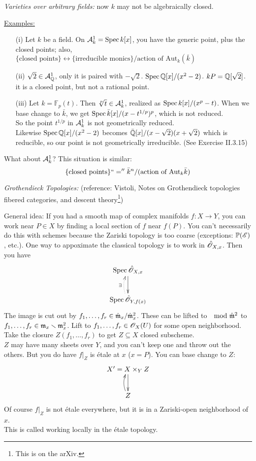  \emph{Varieties over arbitrary fields:} now $k$ may not be
 algebraically closed.

 \underline{Examples:}
 \begin{itemize}
 \item[(i)] Let $k$ be a field.  On $\mathcal{A}^1_k=\text{\rm Spec\,} k[x]$, you have
 the generic point, plus the closed points;  also, $\{\text{closed
 points}\} \leftrightarrow \{\text{irreducible monics}\}/\text{action of Aut}_k(\bar k)$
 \item[(ii)] $\sqrt{2}\in \mathcal{A}^1_{\mathbb{Q}}$, only it is paired with
 $-\sqrt{2}$. $\text{\rm Spec\,} \mathbb{Q}[x]/(x^2-2)$.  $k{P}=\mathbb{Q}[\sqrt{2}]$.  it is
 a closed point, but not a rational point.
 \item[(iii)] Let $k=\mathbb{F}_p(t)$.  Then $\sqrt[p]{t}\in
 \mathcal{A}^1_k$, realized as $\text{\rm Spec\,} k[x]/(x^p-t)$.  When we base change
 to $\bar k$, we get $\text{\rm Spec\,} \bar k[x]/(x-t^{1/p})^p$, which is not
 reduced.\\
 So the point $t^{1/p}$ in $\mathcal{A}^1_k$ is not geometrically
 reduced.\\
 Likewise $\text{\rm Spec\,} \mathbb{Q}[x]/(x^2-2)$ becomes $\bar
 {\mathbb{Q}}[x]/(x-\sqrt{2})(x+\sqrt{2})$ which is reducible, so our point
 is not geometrically irreducible. (See Exercise II.3.15)
 \end{itemize}
 What about $\mathcal{A}^1_k$?  This situation is similar:
 \[
    \{\text{closed points}\} ``='' \bar k^n/(\text{action of Aut}_k\bar k)
 \]

 \emph{Grothendieck Topologies:} (reference: Vistoli, Notes on
Grothendieck topologies fibered categories, and descent theory\footnote{This is on the
arXiv.})

 General idea: If you had a smooth map of complex manifolds $f:X\to
 Y$, you can work near $P\in X$ by finding a local section of $f$
 near $f(P)$.  You can't necessarily do this with schemes because
 the Zariski topology is too coarse (exceptions: $\mathbb{P}(\mathscr{E})$, etc.).
 One way to appoximate the classical topology is to work in $\hat
 {\mathscr{O}}_{X,x}$. Then you have
 \[\xymatrix{
 \spec \hat \O_{X,x} \ar[d]\\
 \spec \hat \O_{Y,f(x)} \ar@{.>}@/^/[u]^{\exists}
 }\]
 The image is cut out by $f_1,\dots, f_r\in \hat {\mathfrak{m}}_x/\hat{\mathfrak{m}}_x^2$.
 These can be lifted to $\mod \hat{\mathfrak{m}}^2$ to $f_1,\dots, f_r\in
 \mathfrak{m}_x\smallsetminus \mathfrak{m}_x^2$.  Lift to $f_1,\dots, f_r\in \mathscr{O}_X(U)$
 for some open neighborhood.  Take the closure $Z(f_1,\dots, f_r)$
 to get $Z\subseteq X$ closed subscheme.\\
 $Z$ may have many sheets over $Y$, and you can't keep one and
 throw out the others.  But you do have $f|_Z$ is \'etale at $x$
 ($x=P$).  You can base change to $Z:$
 \[\xymatrix{
 X' = X\times_Y Z\ar[d]\\
 Z\ar@/^/[u]
 }\]
 Of course $f|_Z$ is not \'etale everywhere, but it is in a
 Zariski-open neighborhood of $x$.\\
 This is called working locally in the \'etale topology.

